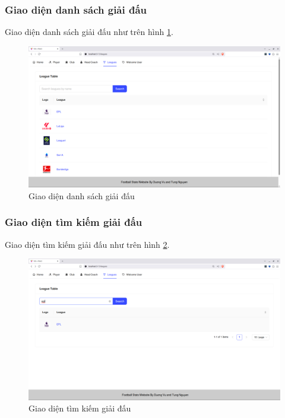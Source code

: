 \documentclass[../BTL.tex]{subfiles}
\begin{document}
\subsubsection{Giao diện danh sách giải đấu}
Giao diện danh sách giải đấu như trên hình \ref{fig:user-league-list}.
\begin{figure}
\centering
\includegraphics[width=1\linewidth]{Hinhve/user-league-list.png}
\caption{Giao diện danh sách giải đấu}
\label{fig:user-league-list}
\end{figure}

\subsubsection{Giao diện tìm kiếm giải đấu}
Giao diện tìm kiếm giải đấu như trên hình \ref{fig:user-league-search}.
\begin{figure}
\centering
\includegraphics[width=1\linewidth]{Hinhve/user-league-search.png}
\caption{Giao diện tìm kiếm giải đấu}
\label{fig:user-league-search}
\end{figure}
\end{document}
